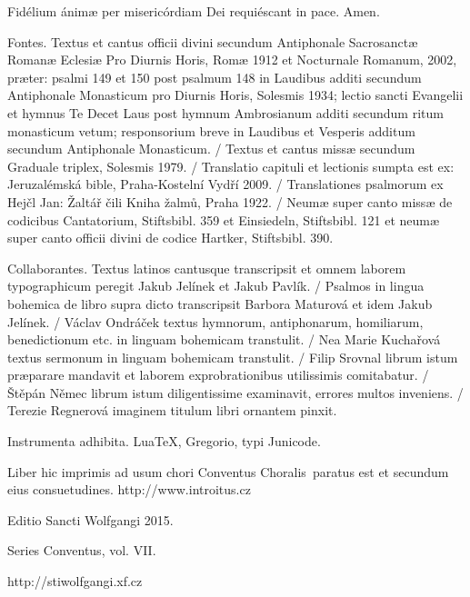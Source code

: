 \documentclass[a4paper, twoside, 12pt]{article}
\newcommand{\annusEditionis}{2015}
\begin{document}
\vfill


\vfill

\noindent \Vbardot{} Fidélium ánimæ per misericórdiam Dei requiéscant in pace.
\Rbardot{} Amen.

\trFideliumAnimae

\vfill
\newpage
\RemoveSideThumbs
\pagestyle{empty}

\vfill

Fontes.
Textus et cantus officii divini secundum
Antiphonale Sacrosanctæ Romanæ Eclesiæ Pro Diurnis Horis, Romæ 1912
et Nocturnale Romanum, 2002, præter: psalmi 149 et 150 post
psalmum 148 in Laudibus additi secundum Antiphonale Monasticum pro Diurnis Horis,
Solesmis 1934; lectio sancti Evangelii et hymnus Te Decet Laus post hymnum
Ambrosianum additi secundum ritum monasticum vetum; responsorium breve
in Laudibus et Vesperis additum secundum Antiphonale Monasticum. /
Textus et cantus missæ secundum
Graduale triplex, Solesmis 1979. /
Translatio capituli et lectionis sumpta est ex:
Jeruzalémská bible, Praha-Kostelní Vydří 2009. /
Translationes psalmorum ex
Hejčl Jan: Žaltář čili Kniha žalmů, Praha 1922. /
Neumæ super canto missæ de codicibus Cantatorium, Stiftsbibl. 359 et Einsiedeln,
Stiftsbibl. 121 et neumæ super canto officii divini de codice Hartker,
Stiftsbibl. 390.

Collaborantes.
Textus latinos cantusque transcripsit et omnem laborem typographicum peregit
Jakub Jelínek et Jakub Pavlík. /
Psalmos in lingua bohemica de libro supra dicto transcripsit
Barbora Maturová et idem Jakub Jelínek. /
Václav Ondráček textus hymnorum, antiphonarum, homiliarum, benedictionum etc.
in linguam bohemicam transtulit. /
Nea Marie Kuchařová textus sermonum in linguam bohemicam transtulit. /
Filip Srovnal librum istum præparare mandavit et laborem exprobrationibus
utilissimis comitabatur. /
Štěpán Němec librum istum diligentissime examinavit, errores multos
inveniens. /
Terezie Regnerová imaginem titulum libri ornantem pinxit.

Instrumenta adhibita.
LuaTeX, %
Gregorio, %
typi Junicode. %

\begin{center}
Liber hic imprimis ad usum chori
\guillemotright Conventus Choralis\guillemotleft\
paratus est
et secundum eius consuetudines.
http://www.introitus.cz

\vfill

{\large Editio Sancti Wolfgangi \annusEditionis.}

\vfill

Series \guillemotright Conventus\guillemotleft, vol. VII.

\vfill

http://stiwolfgangi.xf.cz

\end{center}

\vfill
\end{document}

